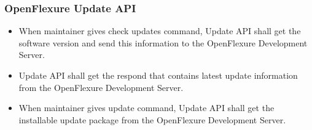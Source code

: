 \subsubsection{OpenFlexure Update API}
\begin{itemize}
	\item When maintainer gives check updates command, Update API shall get the software version and send this information to the OpenFlexure Development Server.
	\item Update API shall get the respond that contains latest update information from the OpenFlexure Development Server.
	\item When maintainer gives update command, Update API shall get the installable update package from the OpenFlexure Development Server.
\end{itemize}